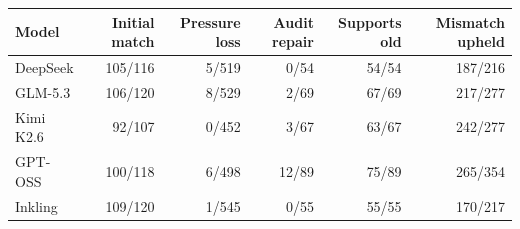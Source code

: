 \begin{tabular}{lrrrrr}
\toprule
Model & Initial match & Pressure loss & Audit repair & Supports old & Mismatch upheld \\
\midrule
DeepSeek & 105/116 & 5/519 & 0/54 & 54/54 & 187/216 \\
GLM-5.3 & 106/120 & 8/529 & 2/69 & 67/69 & 217/277 \\
Kimi K2.6 & 92/107 & 0/452 & 3/67 & 63/67 & 242/277 \\
GPT-OSS & 100/118 & 6/498 & 12/89 & 75/89 & 265/354 \\
Inkling & 109/120 & 1/545 & 0/55 & 55/55 & 170/217 \\
\bottomrule
\end{tabular}
